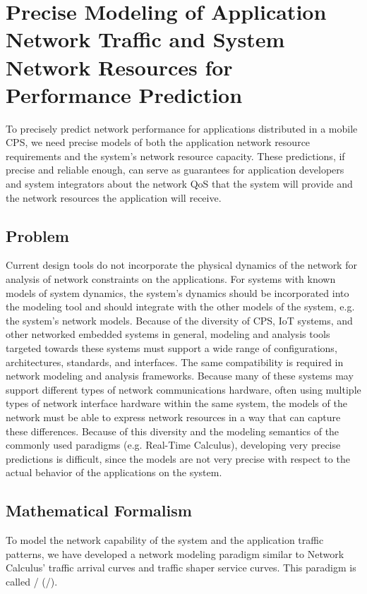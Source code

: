 \section{Precise Modeling of Application Network Traffic and System Network Resources for Performance Prediction}
\label{sec:framework} 

To precisely predict network performance for applications distributed
in a mobile CPS, we need precise models of both the application
network resource requirements and the system's network resource
capacity.  These predictions, if precise and reliable enough, can
serve as guarantees for application developers and system integrators
about the network QoS that the system will provide and the network
resources the application will receive.

\subsection{Problem}
Current design tools do not incorporate the physical dynamics of the
network for analysis of network constraints on the applications. For
systems with known models of system dynamics, the system's dynamics
should be incorporated into the modeling tool and should integrate
with the other models of the system, e.g. the system's network models.
Because of the diversity of CPS, IoT systems, and other networked
embedded systems in general, modeling and analysis tools targeted
towards these systems must support a wide range of configurations,
architectures, standards, and interfaces.  The same compatibility is
required in network modeling and analysis frameworks.  Because many of
these systems may support different types of network communications
hardware, often using multiple types of network interface hardware
within the same system, the models of the network must be able to
express network resources in a way that can capture these differences.
Because of this diversity and the modeling semantics of the commonly
used paradigms (e.g. Real-Time Calculus), developing very precise
predictions is difficult, since the models are not very precise with
respect to the actual behavior of the applications on the system.

\subsection{Mathematical Formalism}
\label{subsec:math_formalism}

To model the network capability of the system and the application
traffic patterns, we have developed a network modeling paradigm
similar to Network Calculus' traffic arrival curves and traffic shaper
service curves.  This paradigm is called \fulltool/ (\shorttool/). 

